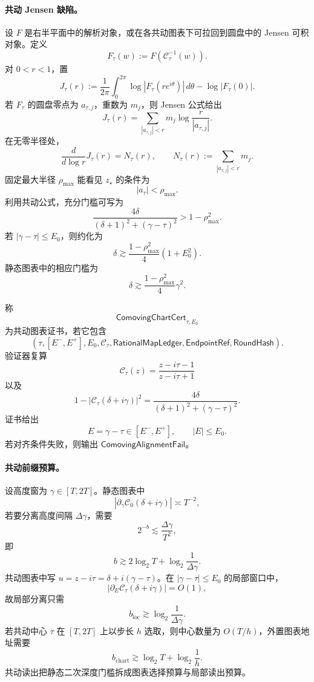 \paragraph{共动 Jensen 缺陷。}
设 \(F\) 是右半平面中的解析对象，或在各共动图表下可拉回到圆盘中的 Jensen 可积对象。定义
\[
F_\tau(w):=F(\mathcal C_\tau^{-1}(w)).
\]
对 \(0<r<1\)，置
\[
\boxed{
J_\tau(r)
:=
\frac1{2\pi}
\int_0^{2\pi}
\log|F_\tau(re^{i\theta})|\,d\theta
-\log|F_\tau(0)|.
}
\]
若 \(F_\tau\) 的圆盘零点为 \(a_{\tau,j}\)，重数为 \(m_j\)，则 Jensen 公式给出
\[
J_\tau(r)
=
\sum_{|a_{\tau,j}|<r}
m_j\log\frac{r}{|a_{\tau,j}|}.
\]
在无零半径处，
\[
\frac{d}{d\log r}J_\tau(r)
=
N_\tau(r),
\qquad
N_\tau(r):=
\sum_{|a_{\tau,j}|<r}m_j.
\]
固定最大半径 \(\rho_{\max}\) 能看见 \(z_\star\) 的条件为
\[
|a_\tau|<\rho_{\max}.
\]
利用共动公式，充分门槛可写为
\[
\frac{4\delta}{(\delta+1)^2+(\gamma-\tau)^2}
>
1-\rho_{\max}^2.
\]
若 \(|\gamma-\tau|\le E_0\)，则约化为
\[
\delta
\gtrsim
\frac{1-\rho_{\max}^2}{4}(1+E_0^2).
\]
静态图表中的相应门槛为
\[
\delta\gtrsim
\frac{1-\rho_{\max}^2}{4}\gamma^2.
\]

\begin{definition}[共动图表证书]\label{def:typed-address-biaxial-completion-comoving-chart-cert}
称
\[
\mathsf{ComovingChartCert}_{\tau,E_0}
\]
为共动图表证书，若它包含
\[
\left(
\tau,
[E^-,E^+],
E_0,
\mathcal C_\tau,
\mathsf{RationalMapLedger},
\mathsf{EndpointRef},
\mathsf{RoundHash}
\right).
\]
验证器复算
\[
\mathcal C_\tau(z)
=
\frac{z-i\tau-1}{z-i\tau+1}
\]
以及
\[
1-|\mathcal C_\tau(\delta+i\gamma)|^2
=
\frac{4\delta}{(\delta+1)^2+(\gamma-\tau)^2}.
\]
证书给出
\[
E=\gamma-\tau\in[E^-,E^+],
\qquad
|E|\le E_0.
\]
若对齐条件失败，则输出 \(\mathsf{ComovingAlignmentFail}\)。
\end{definition}

\paragraph{共动前缀预算。}
设高度窗为 \(\gamma\in[T,2T]\)。静态图表中
\[
|\partial_\gamma\mathcal C_0(\delta+i\gamma)|
\asymp
T^{-2},
\]
若要分离高度间隔 \(\Delta\gamma\)，需要
\[
2^{-b}\lesssim\frac{\Delta\gamma}{T^2},
\]
即
\[
b\gtrsim
2\log_2T+\log_2\frac1{\Delta\gamma}.
\]
共动图表中写 \(u=z-i\tau=\delta+i(\gamma-\tau)\)。在 \(|\gamma-\tau|\le E_0\) 的局部窗口中，
\[
|\partial_E\mathcal C_\tau(\delta+i\gamma)|=O(1),
\]
故局部分离只需
\[
b_{\mathrm{loc}}\gtrsim\log_2\frac1{\Delta\gamma}.
\]
若共动中心 \(\tau\) 在 \([T,2T]\) 上以步长 \(h\) 选取，则中心数量为 \(O(T/h)\)，外置图表地址需要
\[
b_{\mathrm{chart}}
\gtrsim
\log_2T+\log_2\frac1h.
\]
共动读出把静态二次深度门槛拆成图表选择预算与局部读出预算。

